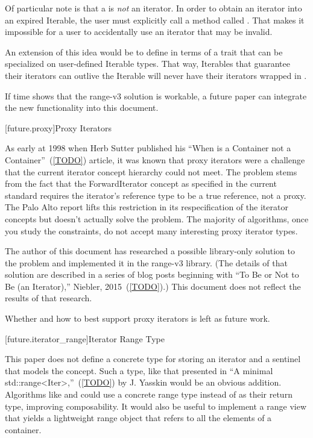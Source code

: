 \pnum
Of particular note is that a  is \textit{not} an iterator. In order to
obtain an iterator into an expired Iterable, the user must explicitly call a method called
. That makes it impossible for a user to accidentally use an iterator that may be
invalid.

\pnum
An extension of this idea would be to define  in terms of a trait that can be
specialized on user-defined Iterable types. That way, Iterables that guarantee their iterators can
outlive the Iterable will never have their iterators wrapped in .

\pnum
If time shows that the range-v3 solution is workable, a future paper can integrate the new
functionality into this document.

[future.proxy]{Proxy Iterators}

\pnum
As early at 1998 when Herb Sutter published his ``When is a Container not a Container''~(\ref{TODO})
article, it was known that proxy iterators were a challenge that the current iterator concept
hierarchy could not meet. The problem stems from the fact that the ForwardIterator concept as
specified in the current standard requires the iterator's reference type to be a true reference, not
a proxy. The Palo Alto report lifts this restriction in its respecification of the iterator
concepts but doesn't actually solve the problem. The majority of algorithms, once you study the
constraints, do not accept many interesting proxy iterator types.

\pnum
The author of this document has researched a possible library-only solution to the problem and
implemented it in the range-v3 library. (The details of that solution are described in a series of
blog posts beginning with ``To Be or Not to Be (an Iterator),'' Niebler, 2015~(\ref{TODO}).) This
document does not reflect the results of that research.

Whether and how to best support proxy iterators is left as future work.

[future.iterator_range]{Iterator Range Type}

\pnum
This paper does not define a concrete type for storing an iterator and a sentinel that models the
 concept. Such a type, like that presented in ``A minimal std::range<Iter>,''~(\ref{TODO})
by J. Yasskin would be an obvious addition. Algorithms like  and
 could use a concrete range type instead of  as their return type,
improving composability. It would also be useful to implement a  range view that
yields a lightweight range object that refers to all the elements of a container.

